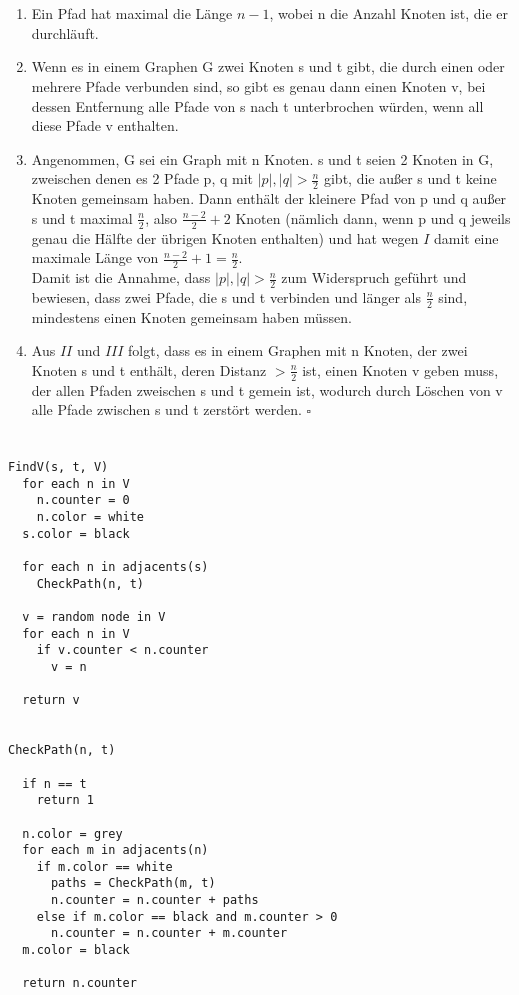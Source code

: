 \documentclass[fleqn]{article}
\begin{document}
\section{}%
\begin{enumerate}[I]
  \item Ein Pfad hat maximal die Länge $n-1$, wobei n die Anzahl Knoten ist, die er durchläuft.
  \item Wenn es in einem Graphen G zwei Knoten s und t gibt, die durch einen oder mehrere  Pfade verbunden sind, so gibt es genau dann einen Knoten v, bei dessen Entfernung alle Pfade von s nach t unterbrochen würden, wenn all diese Pfade v enthalten.
  \item Angenommen, G sei ein Graph mit n Knoten. s und t seien 2 Knoten in G, zweischen denen es 2 Pfade p, q mit $|p|,|q| > \frac{n}{2}$ gibt, die außer s und t keine Knoten gemeinsam haben. Dann enthält der kleinere Pfad von p und q außer s und t maximal $\frac{n}{2}$, also $\frac{n - 2}{2} + 2$ Knoten (nämlich dann, wenn p und q jeweils genau die Hälfte der übrigen Knoten enthalten) und hat wegen $I$ damit eine maximale Länge von $\frac{n - 2}{2} + 1 = \frac{n}{2}$.\\
  Damit ist die Annahme, dass $|p|,|q| > \frac{n}{2}$ zum Widerspruch geführt und bewiesen, dass zwei Pfade, die s und t verbinden und länger als $\frac{n}{2}$ sind, mindestens einen Knoten gemeinsam haben müssen.
  \item Aus $II$ und $III$ folgt, dass es in einem Graphen mit n Knoten, der zwei Knoten s und t enthält, deren Distanz $> \frac{n}{2}$ ist, einen Knoten v geben muss, der allen Pfaden zweischen s und t gemein ist, wodurch durch Löschen von v alle Pfade zwischen s und t zerstört werden. $\square$
\end{enumerate}

\section{}%
\begin{lstlisting}
FindV(s, t, V)
  for each n in V
    n.counter = 0
    n.color = white
  s.color = black
  
  for each n in adjacents(s)
    CheckPath(n, t)
    
  v = random node in V
  for each n in V
    if v.counter < n.counter
      v = n
  
  return v
  
  
CheckPath(n, t)
  
  if n == t
    return 1

  n.color = grey
  for each m in adjacents(n)
    if m.color == white 
      paths = CheckPath(m, t)
      n.counter = n.counter + paths
    else if m.color == black and m.counter > 0
      n.counter = n.counter + m.counter
  m.color = black
  
  return n.counter
  
\end{lstlisting}
\end{document}
